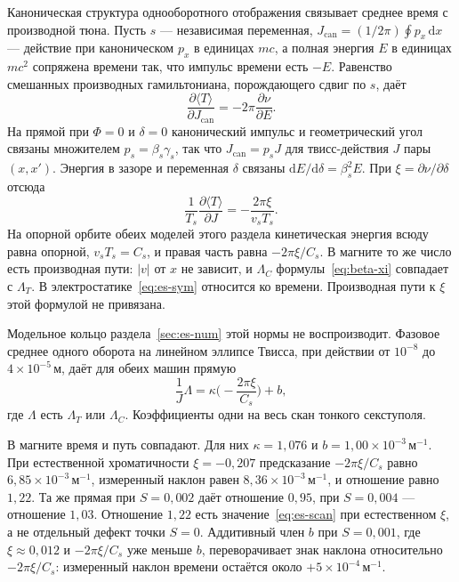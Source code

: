 Каноническая структура однооборотного отображения связывает среднее время с производной тюна. Пусть $s$ --- независимая переменная, $J_{\mathrm{can}}=(1/2\pi)\oint p_x\,\mathrm{d}x$ --- действие при каноническом $p_x$ в единицах $mc$, а полная энергия $E$ в единицах $mc^2$ сопряжена времени так, что импульс времени есть $-E$. Равенство смешанных производных гамильтониана, порождающего сдвиг по $s$, даёт
\begin{equation}
\label{eq:es-dTdJ}
\frac{\partial\langle T\rangle}{\partial J_{\mathrm{can}}}
=-2\pi\frac{\partial\nu}{\partial E}.
\end{equation}
На прямой при $\Phi=0$ и $\delta=0$ канонический импульс и геометрический угол связаны множителем $p_s=\beta_s\gamma_s$, так что $J_{\mathrm{can}}=p_s J$ для твисс-действия $J$ пары $(x,x')$. Энергия в зазоре и переменная $\delta$ связаны $\mathrm{d}E/\mathrm{d}\delta=\beta_s^2 E$. При $\xi=\partial\nu/\partial\delta$ отсюда
\begin{equation}
\label{eq:es-sym}
\frac{1}{T_s}\frac{\partial\langle T\rangle}{\partial J}
=-\frac{2\pi\xi}{v_s T_s}.
\end{equation}
На опорной орбите обеих моделей этого раздела кинетическая энергия всюду равна опорной, $v_s T_s=C_s$, и правая часть равна $-2\pi\xi/C_s$. В магните то же число есть производная пути: $|v|$ от $x$ не зависит, и $\Lambda_C$ формулы~\eqref{eq:beta-xi} совпадает с $\Lambda_T$. В электростатике~\eqref{eq:es-sym} относится ко времени. Производная пути к $\xi$ этой формулой не привязана.

Модельное кольцо раздела~\ref{sec:es-num} этой нормы не воспроизводит. Фазовое среднее одного оборота на линейном эллипсе Твисса, при действии от $10^{-8}$ до $4\times 10^{-5}\,\mathrm{м}$, даёт для обеих машин прямую
\begin{equation}
\label{eq:es-scan}
\frac{1}{J}\Lambda
=\kappa\Biggl(-\frac{2\pi\xi}{C_s}\Biggr)+b,
\end{equation}
где $\Lambda$ есть $\Lambda_T$ или $\Lambda_C$. Коэффициенты одни на весь скан тонкого секступоля.

В магните время и путь совпадают. Для них $\kappa=1{,}076$ и $b=1{,}00\times 10^{-3}\,\mathrm{м}^{-1}$. При естественной хроматичности $\xi=-0{,}207$ предсказание $-2\pi\xi/C_s$ равно $6{,}85\times 10^{-3}\,\mathrm{м}^{-1}$, измеренный наклон равен $8{,}36\times 10^{-3}\,\mathrm{м}^{-1}$, и отношение равно $1{,}22$. Та же прямая при $S=0{,}002$ даёт отношение $0{,}95$, при $S=0{,}004$ --- отношение $1{,}03$. Отношение $1{,}22$ есть значение~\eqref{eq:es-scan} при естественном $\xi$, а не отдельный дефект точки $S=0$. Аддитивный член $b$ при $S=0{,}001$, где $\xi\approx 0{,}012$ и $-2\pi\xi/C_s$ уже меньше $b$, переворачивает знак наклона относительно $-2\pi\xi/C_s$: измеренный наклон времени остаётся около $+5\times 10^{-4}\,\mathrm{м}^{-1}$.

